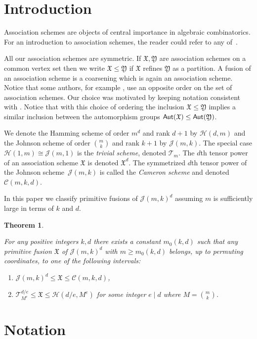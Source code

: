 \documentclass[10pt]{article}
\newtheorem{theorem}{Theorem}[section]
\newcommand {\Aut}[1]{{\sf Aut}({#1})}
\newcommand{\cT}{{\mathcal T}}
\newcommand{\cC}{{\mathcal C}}
\newcommand{\cH}{{\mathcal H}}
\newcommand{\cJ}{{\mathcal J}}
\def\X{\mathfrak{X}}
\def\Y{\mathfrak{Y}}
\def\T{\mathcal{T}}
\begin{document}
\section{Introduction}

Association schemes are objects of central importance in algebraic combinatorics.
For an introduction to association schemes, the reader could refer to any of~\cite{CP,BI,Z,B,E}.

All our association schemes are symmetric.
If $\X, \Y$ are association schemes on a common vertex set then we write $\X \le \Y$ if $\X$ refines $\Y$ as a partition.
A fusion of an association scheme is a coarsening which is again an association scheme.
{Notice that some authors, for example \cite{KK}, use an opposite order on the set of association schemes. Our choice was motivated by keeping notation consistent with \cite{B,E}. Notice that with this choice of ordering the inclusion $\X \le \Y$ implies a similar inclusion between the automorphism groups $\Aut{\X}\le \Aut{\Y}$.}

We denote the Hamming scheme of order $m^d$ and rank $d+1$ by $\cH(d, m)$
and the Johnson scheme of order $\binom{m}{k}$ and rank $k+1$ by $\cJ(m, k)$.
The special case $\cH(1, m) \cong \cJ(m, 1)$ is the \emph{trivial scheme}, denoted $\cT_m$.
The $d$th tensor power of an association scheme $\X$ is denoted $\X^d$.
The symmetrized $d$th tensor power of the Johnson scheme~$\cJ(m, k)$ is called the \emph{Cameron scheme} and denoted $\cC(m, k, d)$.

In this paper we classify primitive fusions of $\cJ(m, k)^d$ assuming $m$ is sufficiently large in terms of $k$ and $d$.


\begin{theorem}
    \label{main-thm}
    {For any positive integers $k,d$ there exists a constant $m_0(k,d)$ such that
    any primitive fusion $\X$ of $\cJ(m, k)^d$ with $m \geq m_0(k, d)$ belongs, up to permuting coordinates, to one of the following intervals:
    \begin{enumerate}
        \item $\cJ(m, k)^d \leq \X \leq \cC(m, k, d)$,  
        \item $\T_{M^e}^{d/e} \leq \X \leq \cH(d/e, M^e)$ for some integer $e \mid d$ where $M=\binom{m}{k}$.
    \end{enumerate}
    }
\end{theorem}
\section{Notation}
\end{document}
